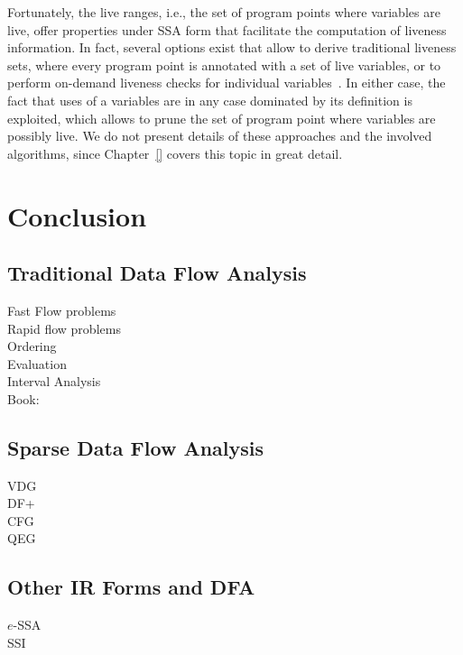 Fortunately, the live ranges, i.e., the set of program points where variables
are live, offer properties under SSA form that facilitate the computation of
liveness information. In fact, several options exist that allow to derive
traditional liveness sets, where every program point is annotated with a set of
live variables, or to perform on-demand liveness checks for individual
variables~\cite{novillo:bib:BHGD08}. In either case, the fact that uses of a
variables are in any case dominated by its definition is exploited, which allows
to prune the set of program point where variables are possibly live. We do not
present details of these approaches and the involved algorithms, since
Chapter~\ref{} covers this topic in great detail.

\section{Conclusion}
\label{novillo:sec:conclusion}

\subsection*{Traditional Data Flow Analysis}
Fast Flow problems ~\cite{novillo:bib:GW76}\\
Rapid flow problems ~\cite{novillo:bib:R78}\\
Ordering~\cite{novillo:bib:KU76}\\
Evaluation~\cite{novillo:bib:CTK06}\\
Interval Analysis~\cite{novillo:bib:A70}\\
Book:~\cite{novillo:bib:NNH99}\\

\subsection*{Sparse Data Flow Analysis}
VDG~\cite{novillo:bib:R95}\\
DF+~\cite{novillo:bib:CCF91}\\
CFG~\cite{novillo:bib:R02}\\
QEG~\cite{novillo:bib:JO93}\\

\subsection*{Other IR Forms and DFA}
$e$-SSA~\cite{novillo:bib:BGV00}\\
SSI~\cite{novillo:bib:S04}\\

